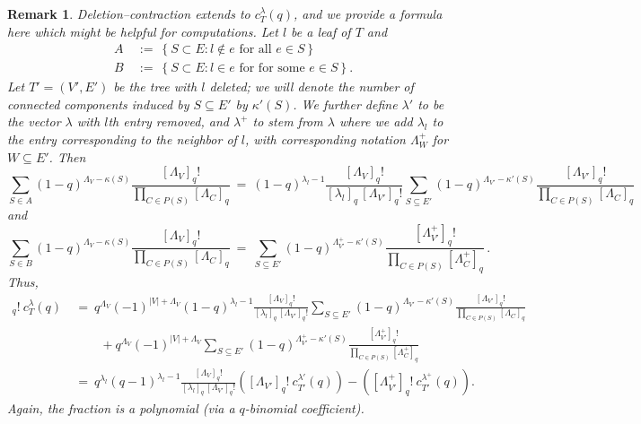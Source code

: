 \documentclass[11pt]{amsart}
\newtheorem{rem}{Remark}
\newenvironment{remark}{\begin{rem}\sf}{\end{rem}}
\begin{document}
\begin{remark}
Deletion--contraction extends to $c^{ \lambda }_T (q)$, and we provide a formula here which might be helpful for computations. 
Let $l$ be a leaf of $T$ and
\begin{align*}
  A \ &:= \ \left\{ S \subset E : l \notin e \text{ for all } e \in S \right\} \\
  B \ &:= \ \left\{ S \subset E : l \in e \text{ for for some } e \in S
\right\} . 
\end{align*}
Let $T' = (V', E')$ be the tree with $l$ deleted; we will denote the number of connected components induced by $S \subseteq E'$ by $\kappa'(S)$.
We further define $\lambda'$ to be the vector $\lambda$ with $l$th entry removed, and $\lambda^+$ to stem from $\lambda$ where we add $\lambda_l$ to the entry corresponding to the neighbor of $l$, with corresponding notation $\Lambda^+_W$ for $W \subseteq E'$. 
Then
\[
  \sum_{S \in A} (1-q)^{ \Lambda_V - \kappa(S) } \frac{ [\Lambda_V]_q! }{ \prod_{ C \in P(S) } [\Lambda_C]_q }
  \ = \ (1-q)^{ \lambda_l - 1 } \frac{ [\Lambda_V]_q! }{ [\lambda_l]_q \,
[\Lambda_{ V' }]_q! } \sum_{ S \subseteq E' } (1-q)^{ \Lambda_{V'} -
\kappa'(S) } \frac{ [\Lambda_{V'}]_q! }{ \prod_{ C \in P(S) } [\Lambda_C]_q }
\]
and
\[
  \sum_{S \in B} (1-q)^{ \Lambda_V - \kappa(S) } \frac{ [\Lambda_V]_q! }{ \prod_{ C \in P(S) } [\Lambda_C]_q }
  \ = \ \sum_{ S \subseteq E' } (1-q)^{ \Lambda^+_{V'} - \kappa'(S) } \frac{
[\Lambda^+_{V'}]_q! }{ \prod_{ C \in P(S) } [\Lambda^+_C]_q } \, .
\]
Thus,
\begin{align*}
  [\Lambda_V]_q! \ c^{ \lambda }_T (q)
  \ &= \ q^{ \Lambda_V } (-1)^{ |V| + \Lambda_V } (1-q)^{ \lambda_l - 1 }
\frac{ [\Lambda_V]_q! }{ [\lambda_l]_q \, [\Lambda_{ V' }]_q! } \sum_{ S
\subseteq E' } (1-q)^{ \Lambda_{V'} -
\kappa'(S) } \frac{ [\Lambda_{V'}]_q! }{ \prod_{ C \in P(S) } [\Lambda_C]_q } \\
  &\qquad + q^{ \Lambda_V } (-1)^{ |V| + \Lambda_V } \sum_{ S \subseteq E' } (1-q)^{ \Lambda^+_{V'} - \kappa'(S) } \frac{
[\Lambda^+_{V'}]_q! }{ \prod_{ C \in P(S) } [\Lambda^+_C]_q } \\
  \ &= \ q^{ \lambda_l } (q-1)^{ \lambda_l - 1 } \frac{ [\Lambda_V]_q! }{
[\lambda_l]_q \, [\Lambda_{ V' }]_q! } \left( [\Lambda_{V'}]_q! \ c^{ \lambda' }_{T'} (q) \right)
  - \left( [\Lambda^+_{V'}]_q! \ c^{ \lambda^+ }_{T'} (q) \right) . 
\end{align*}
Again, the fraction is a polynomial (via a $q$-binomial coefficient).
\end{remark}
\end{document}
